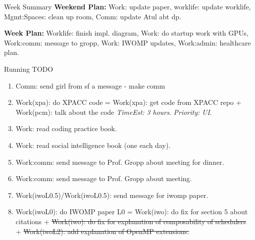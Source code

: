 \documentclass[serif, mathserif, final]{beamer}
\newcommand{\doneTaskNoItem}[1]{\sout{#1}}
\newcommand{\te}[1]{\textit{TimeEst:} \textit{#1}}
\newcommand{\prio}[1]{\textit{Priority:} \textit{#1}}
\newcommand{\comments}[1]{}
\begin{document}
\begin{frame}{}
\begin{columns}
\begin{column}{0.50\linewidth}
\begin{block}{Week Summary}
        {\tiny \textbf{Weekend Plan:} Work: update paper,  worklife:
          update worklife, Mgmt:Spaces: clean up room, Comm: update
          Atul abt dp.} 

        {\tiny \textbf{Week Plan:}
          Worklife: finish impl. diagram,  Work: do startup work with
          GPUs, Work:comm: message to gropp, Work: IWOMP updates,
          Work:admin: healthcare plan.}
      \end{block} 

      \begin{block}{Running TODO} %
        \begin{enumerate} 
          \small \item \small Comm: send girl from sf a message - make comm  
        \item \small Work(xpa): do XPACC code = Work(xpa): get code
          from XPACC repo + Work(pcm): talk about the code \te{3
            hours}. \prio{UI}.

        \item \small Work: read coding practice book. 
        \item \small Work: read social intelligence book (one each day). 


        \item \small Work:comm: send message to Prof. Gropp about
          meeting for dinner. 

        \item \small Work:comm: send message to Prof. Gropp about
          meeting. 
        \item \small Work(iwoL0.5)/Work(iwoL0.5): send message for iwomp paper. 
        \item \small Work(iwoL0): do IWOMP paper L0 = Work(iwo): do fix for
          section 5 about citations + \doneTaskNoItem{Work(iwo): do fix for
          explanation of composability of schedulers} +
          \doneTaskNoItem{Work(iwoL2): add explanation of OpenMP
            extensions.} 

\comments{
          The thing that really made me feel better is that you said
          ``sigh, what a fun weekend .. `` I just wanted to make sure
          you weren't another girl that would come to laugh at my
          awkwardnesses, and instead maybe just enjoy me for the
          weird person that I am. If it's the case you
          had a good time, and there wasn't a second you didn't not
          have fun, then that's truly all I need to hear
          right now.
}


\end{enumerate}
\end{block}
\end{column}
\end{columns}
\end{frame}
\end{document}
